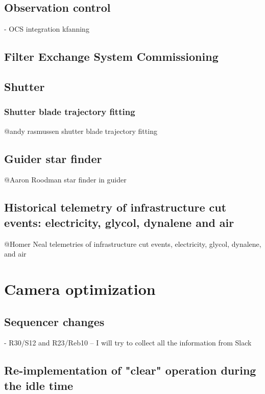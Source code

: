 \documentclass[OPS,lsstdraft,authoryear,toc]{lsstdoc}
\begin{document}
\subsection{Observation control}
- OCS integration kfanning

\subsection{Filter Exchange System Commissioning}



\subsection{Shutter}



\subsubsection{Shutter blade trajectory fitting}
@andy rasmussen  shutter blade trajectory fitting

\subsection{Guider star finder}
@Aaron Roodman star finder in guider

\subsection{Historical telemetry of infrastructure cut events: electricity, glycol, dynalene and air}
@Homer Neal telemetries of infrastructure cut events, electricity, glycol, dynalene, and air

\section{Camera optimization}\label{sec:optimizations}

\subsection{Sequencer changes}


- R30/S12 and R23/Reb10 -- I will try to collect all the information from Slack

\subsection{Re-implementation of "clear" operation during the idle time}

\end{document}
